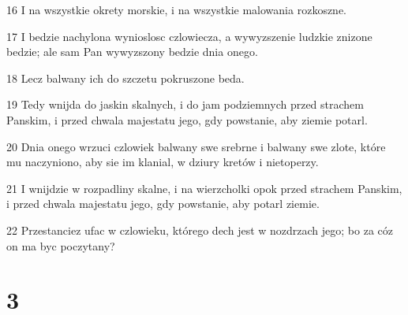 \par 16 I na wszystkie okrety morskie, i na wszystkie malowania rozkoszne.
\par 17 I bedzie nachylona wynioslosc czlowiecza, a wywyzszenie ludzkie znizone bedzie; ale sam Pan wywyzszony bedzie dnia onego.
\par 18 Lecz balwany ich do szczetu pokruszone beda.
\par 19 Tedy wnijda do jaskin skalnych, i do jam podziemnych przed strachem Panskim, i przed chwala majestatu jego, gdy powstanie, aby ziemie potarl.
\par 20 Dnia onego wrzuci czlowiek balwany swe srebrne i balwany swe zlote, które mu naczyniono, aby sie im klanial, w dziury kretów i nietoperzy.
\par 21 I wnijdzie w rozpadliny skalne, i na wierzcholki opok przed strachem Panskim, i przed chwala majestatu jego, gdy powstanie, aby potarl ziemie.
\par 22 Przestanciez ufac w czlowieku, którego dech jest w nozdrzach jego; bo za cóz on ma byc poczytany?

\chapter{3}

